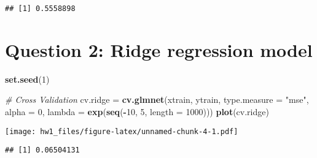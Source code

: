 \documentclass[
]{article}
\newenvironment{Shaded}{\begin{snugshade}}{\end{snugshade}}
\newcommand{\CommentTok}[1]{\textcolor[rgb]{0.56,0.35,0.01}{\textit{#1}}}
\newcommand{\DataTypeTok}[1]{\textcolor[rgb]{0.13,0.29,0.53}{#1}}
\newcommand{\DecValTok}[1]{\textcolor[rgb]{0.00,0.00,0.81}{#1}}
\newcommand{\KeywordTok}[1]{\textcolor[rgb]{0.13,0.29,0.53}{\textbf{#1}}}
\newcommand{\NormalTok}[1]{#1}
\newcommand{\OperatorTok}[1]{\textcolor[rgb]{0.81,0.36,0.00}{\textbf{#1}}}
\newcommand{\StringTok}[1]{\textcolor[rgb]{0.31,0.60,0.02}{#1}}
\begin{document}
\begin{Shaded}
\end{Shaded}

\begin{verbatim}
## [1] 0.5558898
\end{verbatim}

\hypertarget{question-2-ridge-regression-model}{%
\section{Question 2: Ridge regression
model}\label{question-2-ridge-regression-model}}

\begin{Shaded}
\begin{Highlighting}[]
\KeywordTok{set.seed}\NormalTok{(}\DecValTok{1}\NormalTok{)}

\CommentTok{# Cross Validation}
\NormalTok{cv.ridge =}\StringTok{ }\KeywordTok{cv.glmnet}\NormalTok{(xtrain, ytrain, }
                     \DataTypeTok{type.measure =} \StringTok{"mse"}\NormalTok{,}
                     \DataTypeTok{alpha =} \DecValTok{0}\NormalTok{,}
                     \DataTypeTok{lambda =} \KeywordTok{exp}\NormalTok{(}\KeywordTok{seq}\NormalTok{(}\OperatorTok{-}\DecValTok{10}\NormalTok{, }\DecValTok{5}\NormalTok{, }\DataTypeTok{length =} \DecValTok{1000}\NormalTok{)))}
\KeywordTok{plot}\NormalTok{(cv.ridge)}
\end{Highlighting}
\end{Shaded}

\texttt{[image: hw1\_files/figure-latex/unnamed-chunk-4-1.pdf]}

\begin{Shaded}
\end{Shaded}

\begin{verbatim}
## [1] 0.06504131
\end{verbatim}
\end{document}
